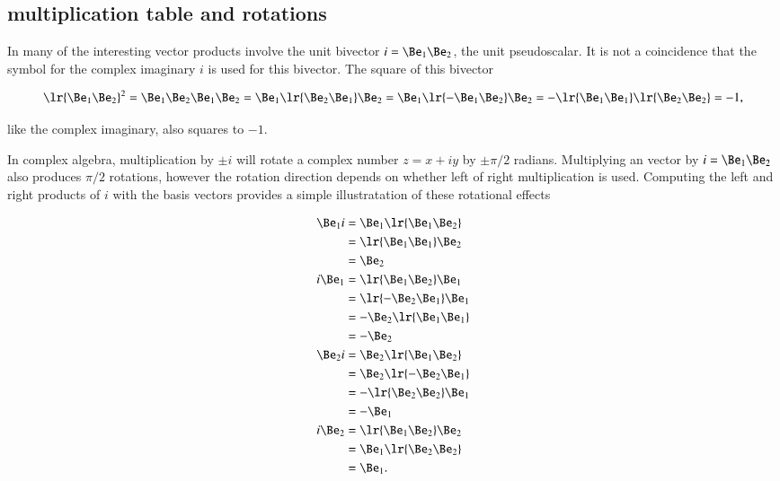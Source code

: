 
\subsection{ multiplication table and rotations}

In  many of the interesting vector products involve the unit bivector \( i = \Be_1 \Be_2 \), the  unit pseudoscalar.
It is not a coincidence that the symbol for the complex imaginary \( i \) is used for this bivector.
The square of this bivector

\begin{dmath}\label{eqn:SimpleProducts2:220}
   \lr{ \Be_1 \Be_2 }^2
   =
   \Be_1 \Be_2
   \Be_1 \Be_2
   =
   \Be_1 \lr{ \Be_2 \Be_1 } \Be_2
   =
   \Be_1 \lr{ -\Be_1 \Be_2 } \Be_2
   =
   -\lr{ \Be_1 \Be_1 }
   \lr{ \Be_2 \Be_2 }
   = -1,
\end{dmath}

like the complex imaginary, also squares to \( -1 \).

In complex algebra, multiplication by \( \pm i \) will rotate a complex number \( z = x + i y \) by \( \pm \pi/2 \) radians.
Multiplying an  vector by \( i = \Be_1 \Be_2 \) also produces \( \pi/2 \) rotations, however the rotation direction depends on whether left of right multiplication is used.
Computing the left and right products of \( i \) with the  basis vectors provides a
simple illustratation of these rotational effects

\begin{dmath}\label{eqn:SimpleProducts2:180}
\begin{aligned}
   \Be_1 i &= \Be_1 \lr{ \Be_1 \Be_2 } \\
           &= \lr{ \Be_1 \Be_1 } \Be_2 \\
           &= \Be_2 \\
   i \Be_1 &= \lr{ \Be_1 \Be_2 } \Be_1 \\
           &= \lr{ -\Be_2 \Be_1 } \Be_1 \\
           &= -\Be_2 \lr{ \Be_1 \Be_1 } \\
           &= -\Be_2 \\
   \Be_2 i &= \Be_2 \lr{ \Be_1 \Be_2 } \\
           &= \Be_2 \lr{ -\Be_2 \Be_1 } \\
           &= -\lr{ \Be_2 \Be_2 }\Be_1 \\
           &= -\Be_1 \\
   i \Be_2 &= \lr{ \Be_1 \Be_2 } \Be_2 \\
           &= \Be_1 \lr{ \Be_2 \Be_2 } \\
           &= \Be_1.
\end{aligned}
\end{dmath}

